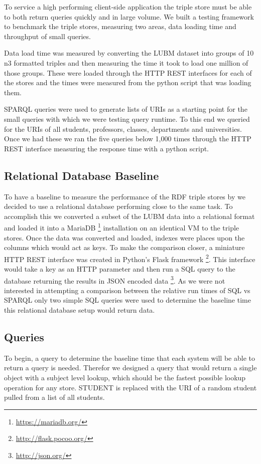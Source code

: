\documentclass{llncs}
\begin{document}
To service a high performing client-side application the triple store must be able to both return queries quickly and in large volume.  We built a testing framework to benchmark the triple stores, measuring two areas, data loading time and throughput of small queries.

Data load time was measured by converting the LUBM dataset into groups of 10 n3 formatted triples and then measuring the time it took to load one million of those groups.  These were loaded through the HTTP REST interfaces for each of the stores and the times were measured from the python script that was loading them.

SPARQL queries were used to generate lists of URIs as a starting point for the small queries with which we were testing query runtime.  To this end we queried for the URIs of all students, professors, classes, departments and universities.  Once we had these we ran the five queries below 1,000 times through the HTTP REST interface measuring the response time with a python script.

\subsection{Relational Database Baseline}
To have a baseline to measure the performance of the RDF triple stores by we decided to use a relational database performing close to the same task.  To accomplish this we converted a subset of the LUBM data into a relational format and loaded it into a MariaDB \footnote{\url{https://mariadb.org/}} installation on an identical VM to the triple stores. Once the data was converted and loaded, indexes were places upon the columns which would act as keys. To make the comparison closer, a miniature HTTP REST interface was created in Python's Flask framework \footnote{\url{http://flask.pocoo.org/}}. This interface would take a key as an HTTP parameter and then run a SQL query to the database returning the results in JSON encoded data \footnote{\url{http://json.org/}}. As we were not interested in attempting a comparison between the relative run times of SQL vs SPARQL only two simple SQL queries were used to determine the baseline time this relational database setup would return data.

\subsection{Queries}
To begin, a query to determine the baseline time that each system will be able to return a query is needed.  Therefor we designed a query that would return a single object with a subject level lookup, which should be the fastest possible lookup operation for any store.  STUDENT is replaced with the URI of a random student pulled from a list of all students.
\end{document}
